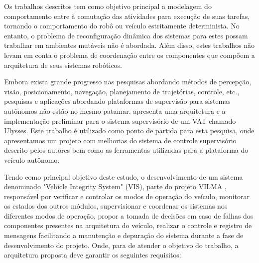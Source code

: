 \documentclass[conference]{IEEEtran}
\begin{document}
Os trabalhos descritos tem como objetivo principal a modelagem do comportamento entre à comutação das atividades para execução de suas tarefas, tornando o comportamento do robô ou veículo estritamente determinista. No entanto, o problema de reconfiguração dinâmica dos sistemas para estes possam trabalhar em ambientes mutáveis não é abordada. Além disso, estes trabalhos não levam em conta o problema de coordenação entre os componentes que compõem a arquitetura de seus sistemas robóticos.

Embora exista grande progresso nas pesquisas abordando métodos de percepção, visão, posicionamento, navegação, planejamento de trajetórias, controle, etc., pesquisas e aplicações abordando plataformas de supervisão para sistemas autônomos não estão no mesmo patamar. \cite{event_supervisory_land_1157827} apresenta uma arquitetura e a implementação preliminar para o sistema supervisório de um VAT chamado Ulysses. Este trabalho é utilizado como ponto de partida para esta pesquisa, onde apresentamos um projeto com melhorias do sistema de controle supervisório descrito pelos autores bem como as ferramentas utilizadas para a plataforma do veículo autônomo. 


Tendo como principal objetivo deste estudo, o desenvolvimento de um sistema denominado "Vehicle Integrity System" (VIS), parte do projeto VILMA \cite{lma_vilma_website}, responsável por verificar e controlar os modos de operação do veículo, monitorar os estados dos outros módulos, supervisionar e coordenar os sistemas nos diferentes modos de operação, propor a tomada de decisões em caso de falhas dos componentes presentes na arquitetura do veículo, realizar o controle e registro de mensagens facilitando a manutenção e depuração do sistema durante a fase de desenvolvimento do projeto. Onde, para de atender o objetivo do trabalho, a arquitetura proposta deve garantir os seguintes requisitos:
\end{document}
